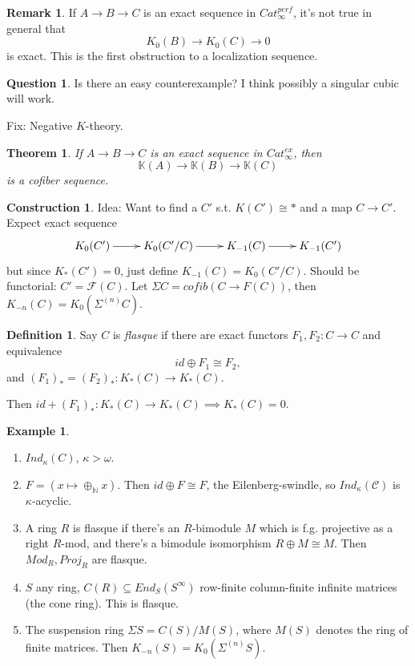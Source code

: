 \documentclass[letterpaper]{article}
\newtheorem{theorem}{Theorem}
\theoremstyle{definition}
\newtheorem{example}[lemma]{Example}
\newtheorem{definition}[lemma]{Definition}
\newtheorem{remark}[lemma]{Remark}
\newtheorem{question}{Question}
\newtheorem{construction}{Construction}
\newcommand{\mbb}{\mathbb}
\newcommand{\mc}{\mathcal}
\begin{document}
\begin{remark}
If $A \rightarrow B \rightarrow C$ is an exact sequence in
$Cat_{\infty}^{perf}$, it's not true in general that
\[
K_0(B) \rightarrow K_0(C) \rightarrow 0
\]
is exact. This is the first obstruction to a localization sequence. 
\end{remark}

\begin{question}
Is there an easy counterexample? I think possibly a singular cubic
will work. 
\end{question}

Fix: Negative $K$-theory.

\begin{theorem}
If $A \rightarrow B \rightarrow C$ is an exact sequence in
$Cat_{\infty}^{ex}$, then 
\[
\mbb K(A) \rightarrow \mbb K(B) \rightarrow \mbb K(C)
\]
is a cofiber sequence.
\end{theorem}

\begin{construction}
Idea: Want to find a $C'$ s.t. $K(C') \cong *$ and a map $C
\rightarrow C'$. Expect exact sequence
\[
\xymatrix{K_0(C') \ar[r] & K_0(C'/C) \ar[r] & K_{-1}(C) \ar[r] & K_{-1}(C')}
\]
but since $K_*(C') = 0$, just define $K_{-1}(C) = K_0(C'/C)$. Should
be functorial: $C' = \mc F(C)$. Let $\Sigma C = cofib(C \rightarrow
F(C))$, then $K_{-n}(C) = K_0(\Sigma^{(n)}C)$.
\end{construction}

\begin{definition}
Say $C$ is \emph{flasque} if there are exact functors $F_1,F_2 : C
\rightarrow C$ and equivalence
\[
id \oplus F_1 \cong F_2,
\]
and $(F_1)_* = (F_2)_* : K_*(C) \rightarrow K_*(C)$. 


\end{definition}

Then $id +
(F_1)_* : K_*(C) \rightarrow K_*(C) \implies K_*(C) = 0$.

\begin{example}
\begin{enumerate}
\item $Ind_\kappa(C)$, $\kappa > \omega$.
\item $F = (x \mapsto \oplus_{\mbb N} x)$. Then $id \oplus F \cong F$,
  the Eilenberg-swindle, so $Ind_\kappa(\mc C)$ is $\kappa$-acyclic. 
\item A ring $R$ is flasque if there's an $R$-bimodule $M$ which is
  f.g. projective as a right $R$-mod, and there's a bimodule
  isomorphism $R\oplus M \cong M$. Then $Mod_R, Proj_R$ are flasque. 
\item $S$ any ring, $C(R) \subseteq End_S(S^\infty)$ row-finite
  column-finite infinite matrices (the cone ring). This is flasque. 
\item The suspension ring $\Sigma S = C(S)/M(S)$, where $M(S)$ denotes
  the ring of finite matrices. Then $K_{-n}(S) = K_0(\Sigma^{(n)} S)$.
\end{enumerate}
\end{example}
\end{document}
